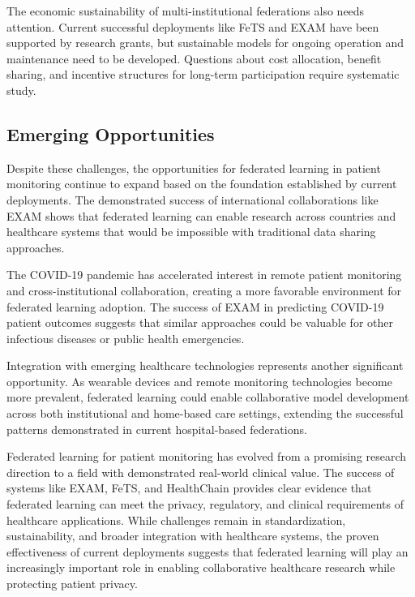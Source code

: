 \documentclass[3p,times,procedia]{elsarticle}
\begin{document}
The economic sustainability of multi-institutional federations also needs attention. Current successful deployments like FeTS and EXAM have been supported by research grants, but sustainable models for ongoing operation and maintenance need to be developed. Questions about cost allocation, benefit sharing, and incentive structures for long-term participation require systematic study.

\subsection{Emerging Opportunities}

Despite these challenges, the opportunities for federated learning in patient monitoring continue to expand based on the foundation established by current deployments. The demonstrated success of international collaborations like EXAM shows that federated learning can enable research across countries and healthcare systems that would be impossible with traditional data sharing approaches.

The COVID-19 pandemic has accelerated interest in remote patient monitoring and cross-institutional collaboration, creating a more favorable environment for federated learning adoption. The success of EXAM in predicting COVID-19 patient outcomes suggests that similar approaches could be valuable for other infectious diseases or public health emergencies.

Integration with emerging healthcare technologies represents another significant opportunity. As wearable devices and remote monitoring technologies become more prevalent, federated learning could enable collaborative model development across both institutional and home-based care settings, extending the successful patterns demonstrated in current hospital-based federations.

Federated learning for patient monitoring has evolved from a promising research direction to a field with demonstrated real-world clinical value. The success of systems like EXAM, FeTS, and HealthChain provides clear evidence that federated learning can meet the privacy, regulatory, and clinical requirements of healthcare applications. While challenges remain in standardization, sustainability, and broader integration with healthcare systems, the proven effectiveness of current deployments suggests that federated learning will play an increasingly important role in enabling collaborative healthcare research while protecting patient privacy.
\end{document}
